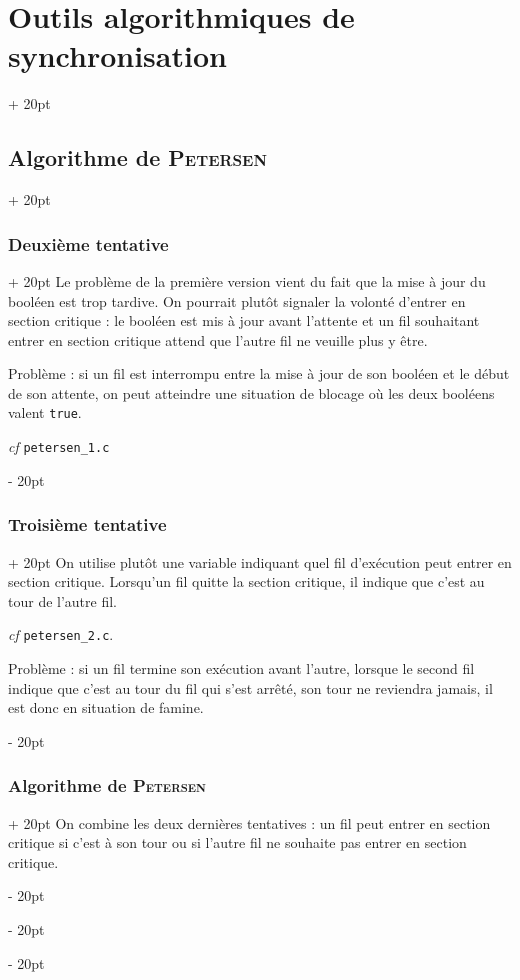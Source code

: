\documentclass[a4paper, 12pt, twoside]{article}
\newcommand{\ind}[1][20pt]{\advance\leftskip + #1}
\newcommand{\deind}[1][20pt]{\advance\leftskip - #1}
\newenvironment{indt}[2][20pt]{#2 \par \ind[#1]}{\par \deind} %
\begin{document}
\begin{indt}{\section{Outils algorithmiques de synchronisation}}
\begin{indt}{\subsection{Algorithme de \textsc{Petersen}}}
            \begin{indt}{\subsubsection{Deuxième tentative}}
                Le problème de la première version vient du fait que la mise à jour du booléen est trop tardive. On pourrait plutôt signaler la volonté d'entrer en section critique : le booléen est mis à jour avant l'attente et un fil souhaitant entrer en section critique attend que l'autre fil ne veuille plus y être.

                Problème : si un fil est interrompu entre la mise à jour de son booléen et le début de son attente, on peut atteindre une situation de blocage où les deux booléens valent \texttt{true}.

                \textit{cf} \texttt{petersen\_1.c}
            \end{indt}

            \vspace{12pt}
            
            \begin{indt}{\subsubsection{Troisième tentative}}
                On utilise plutôt une variable indiquant quel fil d'exécution peut entrer en section critique.
                Lorsqu'un fil quitte la section critique, il indique que c'est au tour de l'autre fil.

                \textit{cf} \texttt{petersen\_2.c}.

                Problème : si un fil termine son exécution avant l'autre, lorsque le second fil indique que c'est au tour du fil qui s'est arrêté, son tour ne reviendra jamais, il est donc en situation de famine.
            \end{indt}

            \vspace{12pt}
            
            \begin{indt}{\subsubsection{Algorithme de \textsc{Petersen}}}
                On combine les deux dernières tentatives : un fil peut entrer en section critique si c'est à son tour ou si l'autre fil ne souhaite pas entrer en section critique.


\end{indt}
\end{indt}
\end{indt}
\end{document}
